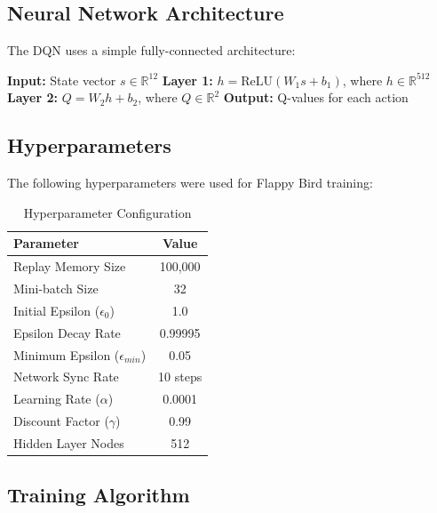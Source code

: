 \documentclass[12pt,a4paper]{article}
\begin{document}
\subsection{Neural Network Architecture}
The DQN uses a simple fully-connected architecture:

\begin{algorithm}
\caption{DQN Forward Pass}
\begin{algorithmic}
\State \textbf{Input:} State vector $s \in \mathbb{R}^{12}$
\State \textbf{Layer 1:} $h = \text{ReLU}(W_1 s + b_1)$, where $h \in \mathbb{R}^{512}$
\State \textbf{Layer 2:} $Q = W_2 h + b_2$, where $Q \in \mathbb{R}^{2}$
\State \textbf{Output:} Q-values for each action
\end{algorithmic}
\end{algorithm}

\subsection{Hyperparameters}
The following hyperparameters were used for Flappy Bird training:

\begin{table}[H]
\centering
\begin{tabular}{|l|c|}
\hline
\textbf{Parameter} & \textbf{Value} \\
\hline
Replay Memory Size & 100,000 \\
Mini-batch Size & 32 \\
Initial Epsilon ($\epsilon_0$) & 1.0 \\
Epsilon Decay Rate & 0.99995 \\
Minimum Epsilon ($\epsilon_{min}$) & 0.05 \\
Network Sync Rate & 10 steps \\
Learning Rate ($\alpha$) & 0.0001 \\
Discount Factor ($\gamma$) & 0.99 \\
Hidden Layer Nodes & 512 \\
\hline
\end{tabular}
\caption{Hyperparameter Configuration}
\end{table}

\subsection{Training Algorithm}
\end{document}
